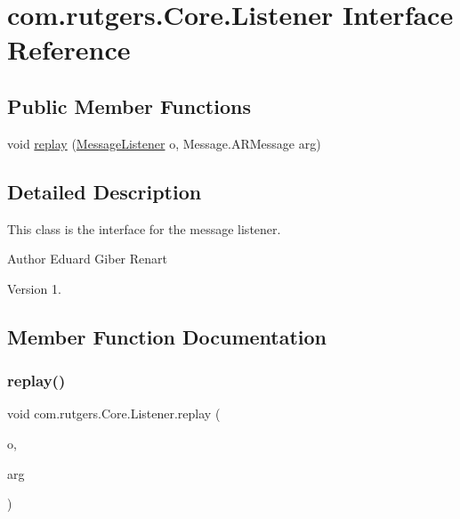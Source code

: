 \hypertarget{interfacecom_1_1rutgers_1_1Core_1_1Listener}{}\section{com.\+rutgers.\+Core.\+Listener Interface Reference}
\label{interfacecom_1_1rutgers_1_1Core_1_1Listener}
\subsection*{Public Member Functions}
\begin{DoxyCompactItemize}
\item 
void \hyperlink{interfacecom_1_1rutgers_1_1Core_1_1Listener_a55c7d023e5fcfe48e12986a476410fe7}{replay} (\hyperlink{classcom_1_1rutgers_1_1Core_1_1MessageListener}{Message\+Listener} o, Message.\+A\+R\+Message arg)
\end{DoxyCompactItemize}


\subsection{Detailed Description}
This class is the interface for the message listener.

\begin{DoxyAuthor}{Author}
Eduard Giber Renart 
\end{DoxyAuthor}
\begin{DoxyVersion}{Version}
1. 
\end{DoxyVersion}


\subsection{Member Function Documentation}
\mbox{\label{interfacecom_1_1rutgers_1_1Core_1_1Listener_a55c7d023e5fcfe48e12986a476410fe7}} 
\subsubsection{\texorpdfstring{replay()}{replay()}}
{\footnotesize\ttfamily void com.\+rutgers.\+Core.\+Listener.\+replay (\begin{DoxyParamCaption}\item[{\hyperlink{classcom_1_1rutgers_1_1Core_1_1MessageListener}{Message\+Listener}}]{o,  }\item[{Message.\+A\+R\+Message}]{arg }\end{DoxyParamCaption})}

